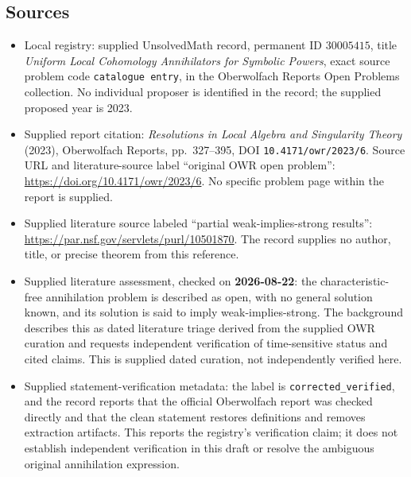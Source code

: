 \documentclass[11pt]{article}
\begin{document}
\subsection{Sources}
\begin{itemize}
\item Local registry: supplied UnsolvedMath record, permanent ID \(30005415\), title \emph{Uniform Local Cohomology Annihilators for Symbolic Powers}, exact source problem code \texttt{catalogue entry}, in the Oberwolfach Reports Open Problems collection. No individual proposer is identified in the record; the supplied proposed year is 2023.
\item Supplied report citation: \emph{Resolutions in Local Algebra and Singularity Theory} (2023), Oberwolfach Reports, pp.~327--395, DOI \texttt{10.4171/owr/2023/6}. Source URL and literature-source label ``original OWR open problem'': \url{https://doi.org/10.4171/owr/2023/6}. No specific problem page within the report is supplied.
\item Supplied literature source labeled ``partial weak-implies-strong results'': \url{https://par.nsf.gov/servlets/purl/10501870}. The record supplies no author, title, or precise theorem from this reference.
\item Supplied literature assessment, checked on \textbf{2026-08-22}: the characteristic-free annihilation problem is described as open, with no general solution known, and its solution is said to imply weak-implies-strong. The background describes this as dated literature triage derived from the supplied OWR curation and requests independent verification of time-sensitive status and cited claims. This is supplied dated curation, not independently verified here.
\item Supplied statement-verification metadata: the label is \texttt{corrected\_verified}, and the record reports that the official Oberwolfach report was checked directly and that the clean statement restores definitions and removes extraction artifacts. This reports the registry's verification claim; it does not establish independent verification in this draft or resolve the ambiguous original annihilation expression.
\end{itemize}
\end{document}

